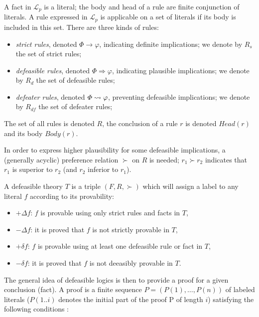 \documentclass[version=3.21, pagesize, twoside=off, bibliography=totoc, DIV=calc, fontsize=12pt, a4paper, french, english]{scrartcl}
\begin{document}
A fact in $\mathcal{L}_p$ is a literal; the body and head of a rule are finite conjunction of literals. A rule expressed in $\mathcal{L}_p$ is applicable on a set of literals if its body is included in this set.
There are three kinds of rules:
\begin{itemize}
\item \emph{strict rules}, denoted $\Phi \rightarrow \varphi$, indicating definite implications; we denote by $R_s$ the set of strict rules;
\item \emph{defeasible rules}, denoted $\Phi \Rightarrow \varphi$, indicating plausible implications; we denote by $R_d$ the set of defeasible rules;
\item \emph{defeater rules}, denoted $\Phi \mathrel{\leadsto} \varphi$, preventing defeasible implications; we denote by $R_{df}$ the set of defeater rules;
\end{itemize}
The set of all rules is denoted $R$, the conclusion of a rule $r$ is denoted $Head(r)$ and its body $Body(r)$.

In order to express higher plausibility for some defeasible implications, a (generally acyclic) preference relation $\succ$ on $R$ is needed; $r_1 \succ r_2$ indicates that $r_1$ is superior to $r_2$ (and $r_2$ inferior to $r_1$).

A defeasible theory $T$ is a triple $(F,R,\succ)$ which will assign a label to any literal $f$ according to its provability:
\begin{itemize}
\item $+\Delta f$: $f$ is provable using only strict rules and facts in $T$,
\item $-\Delta f$: it is proved that $f$ is not strictly provable in $T$,
\item $+\delta f$: $f$ is provable using at least one defeasible rule or fact in $T$,
\item $-\delta f$: it is proved that $f$ is not deeasibly provable in $T$.
\end{itemize}

The general idea of defeasible logics is then to provide a proof for a given conclusion (fact). A proof is a finite sequence $P = (P(1), \dots, P(n))$ of labeled literals ($P(1..i)$ denotes the initial part of the proof P of length $i$) satisfying the following conditions \cite{Billington1993}:
\end{document}
